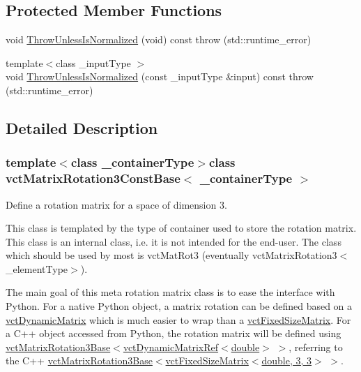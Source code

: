 \subsection*{Protected Member Functions}
\begin{DoxyCompactItemize}
\item 
void \hyperlink{classvct_matrix_rotation3_const_base_aee8cc510b855f90a37ff8c670d6b0557}{Throw\+Unless\+Is\+Normalized} (void) const   throw (std\+::runtime\+\_\+error)
\item 
{\footnotesize template$<$class \+\_\+input\+Type $>$ }\\void \hyperlink{classvct_matrix_rotation3_const_base_aea7676e36ddcb2600bd6283debf47634}{Throw\+Unless\+Is\+Normalized} (const \+\_\+input\+Type \&input) const   throw (std\+::runtime\+\_\+error)
\end{DoxyCompactItemize}


\subsection{Detailed Description}
\subsubsection*{template$<$class \+\_\+container\+Type$>$class vct\+Matrix\+Rotation3\+Const\+Base$<$ \+\_\+container\+Type $>$}

Define a rotation matrix for a space of dimension 3. 

This class is templated by the type of container used to store the rotation matrix. This class is an internal class, i.\+e. it is not intended for the end-\/user. The class which should be used by most is vct\+Mat\+Rot3 (eventually vct\+Matrix\+Rotation3$<$\+\_\+element\+Type$>$).

The main goal of this meta rotation matrix class is to ease the interface with Python. For a native Python object, a matrix rotation can be defined based on a \hyperlink{classvct_dynamic_matrix}{vct\+Dynamic\+Matrix} which is much easier to wrap than a \hyperlink{classvct_fixed_size_matrix}{vct\+Fixed\+Size\+Matrix}. For a C++ object accessed from Python, the rotation matrix will be defined using \hyperlink{classvct_matrix_rotation3_base}{vct\+Matrix\+Rotation3\+Base}$<$\hyperlink{classvct_dynamic_matrix_ref}{vct\+Dynamic\+Matrix\+Ref$<$double$>$} $>$, referring to the C++ \hyperlink{classvct_matrix_rotation3_base}{vct\+Matrix\+Rotation3\+Base}$<$\hyperlink{classvct_fixed_size_matrix}{vct\+Fixed\+Size\+Matrix$<$double, 3, 3$>$} $>$.


